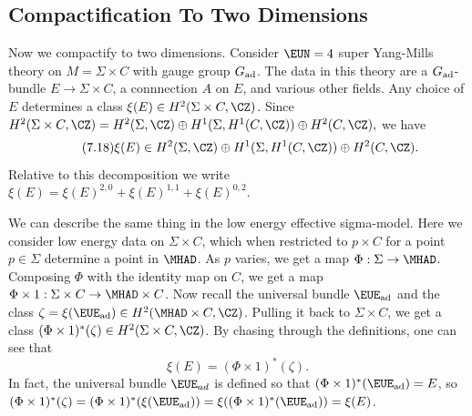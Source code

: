 
\subsection{Compactification To Two Dimensions} \label{sec:comptwop}

Now we compactify to two dimensions. Consider ${\EUN}=4$ super
Yang-Mills theory on $M=\Sigma\times C$ with gauge group
$G_{\rm{ad}}$. The data in this theory are a $G_{\rm{ad}}$-bundle
$E\to\Sigma\times C$, a connnection $A$ on $E$, and various other
fields.  Any choice of $E$ determines a class $\xi(E)\in
H^2(\Sigma\times C,\CZ)$.  Since $H^2(\Sigma\times
C,\CZ)=H^2(\Sigma,\CZ)\oplus H^1(\Sigma,H^1(C,\CZ))\oplus
H^2(C,\CZ),$ we have %
\begin{equation*}
\tag*{(7.18)}
\xi(E)\in H^2(\Sigma,\CZ)\oplus
H^1(\Sigma,H^1(C,\CZ))\oplus H^2(C,\CZ).
\end{equation*}
 Relative to this
decomposition we write
$\xi(E)=\xi(E)^{2,0}+\xi(E)^{1,1}+\xi(E)^{0,2}$.

We can describe the same thing in the low energy effective
sigma-model.  Here we consider low energy data on $\Sigma\times
C$, which when restricted to $p\times C$ for a point $p\in \Sigma$
determine a point in $\MHAD$.  As $p$ varies, we get a map
$\Phi:\Sigma\to \MHAD$.   Composing $\Phi$ with the identity map
on $C$, we get a map $\Phi\times 1:\Sigma\times C\to \MHAD\times
C$. Now recall the universal bundle ${\EUE}_{\rm ad}$ and the
class $\zeta=\xi({\EUE}_{\rm {ad}})\in H^2( \MHAD\times C,\CZ)$.
Pulling it back to $\Sigma\times C$, we get a class $(\Phi\times
1)^*(\zeta)\in H^2(\Sigma\times C,\CZ)$. By chasing through the
definitions, one can see that %
\setcounter{equation}{18}
\begin{equation}\label{eq:yrog}
\xi(E)=(\Phi\times
1)^*(\zeta).
\end{equation}
 In fact, the universal bundle ${\EUE}_{ad}$ is
defined so that $(\Phi\times 1)^*({\EUE}_{{\rm ad}})=E$, so
$(\Phi\times 1)^*(\zeta)=(\Phi\times 1)^*(\xi(\EUE_{{\rm ad}}))
=\xi((\Phi\times 1)^*(\EUE_{{\rm ad}}))=\xi(E)$.

